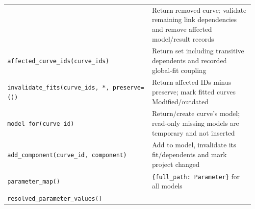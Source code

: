 \documentclass[
  10pt,
  a4paper,
  oneside]{scrreprt}
\begin{document}
\begin{longtable}[]{@{}ll@{}}
\begin{minipage}[t]{0.47\columnwidth}
\end{minipage} & \begin{minipage}[t]{0.47\columnwidth}\raggedright
Return removed curve; validate remaining link dependencies and remove
affected model/result records\strut
\end{minipage}\tabularnewline
\begin{minipage}[t]{0.47\columnwidth}\raggedright
\texttt{affected\_curve\_ids(curve\_ids)}\strut
\end{minipage} & \begin{minipage}[t]{0.47\columnwidth}\raggedright
Return set including transitive dependents and recorded global-fit
coupling\strut
\end{minipage}\tabularnewline
\begin{minipage}[t]{0.47\columnwidth}\raggedright
\texttt{invalidate\_fits(curve\_ids,\ *,\ preserve=())}\strut
\end{minipage} & \begin{minipage}[t]{0.47\columnwidth}\raggedright
Return affected IDs minus preserve; mark fitted curves
Modified/outdated\strut
\end{minipage}\tabularnewline
\begin{minipage}[t]{0.47\columnwidth}\raggedright
\texttt{model\_for(curve\_id)}\strut
\end{minipage} & \begin{minipage}[t]{0.47\columnwidth}\raggedright
Return/create curve's model; read-only missing models are temporary and
not inserted\strut
\end{minipage}\tabularnewline
\begin{minipage}[t]{0.47\columnwidth}\raggedright
\texttt{add\_component(curve\_id,\ component)}\strut
\end{minipage} & \begin{minipage}[t]{0.47\columnwidth}\raggedright
Add to model, invalidate its fit/dependents and mark project
changed\strut
\end{minipage}\tabularnewline
\begin{minipage}[t]{0.47\columnwidth}\raggedright
\texttt{parameter\_map()}\strut
\end{minipage} & \begin{minipage}[t]{0.47\columnwidth}\raggedright
\texttt{\{full\_path:\ Parameter\}} for all models\strut
\end{minipage}\tabularnewline
\begin{minipage}[t]{0.47\columnwidth}\raggedright
\texttt{resolved\_parameter\_values()}\strut

\end{minipage}
\end{longtable}
\end{document}
